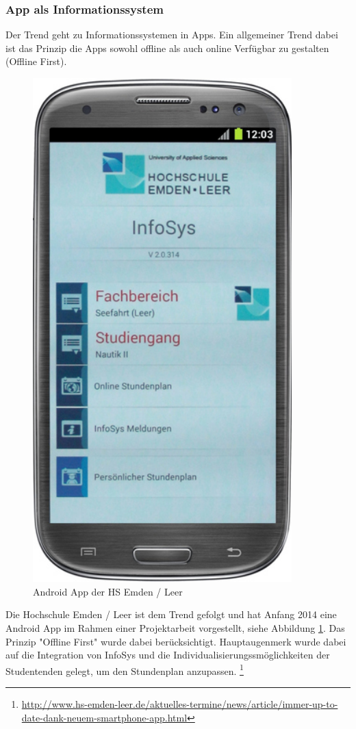 \documentclass[a4paper, 12pt]{scrreprt}
\begin{document}
\subsubsection{App als Informationssystem}
Der Trend geht zu Informationssystemen in Apps. Ein allgemeiner Trend dabei ist das Prinzip die Apps sowohl offline als auch online Verfügbar zu gestalten (Offline First).

\begin{figure}[h!]
	\centering
	\includegraphics[width=10cm]{bilder_aurel/hsel-androidapp}
	\caption{Android App der HS Emden / Leer}
	\label{fig_hselandroidapp}
\end{figure}

Die Hochschule Emden / Leer ist dem Trend gefolgt und hat Anfang 2014 eine Android App im Rahmen einer Projektarbeit vorgestellt, siehe Abbildung \ref{fig_hselandroidapp}. Das Prinzip "Offline First" wurde dabei berücksichtigt. Hauptaugenmerk wurde dabei auf die Integration von InfoSys und die Individualisierungssmöglichkeiten der Studentenden gelegt, um den Stundenplan anzupassen. \footnote{\url{http://www.hs-emden-leer.de/aktuelles-termine/news/article/immer-up-to-date-dank-neuem-smartphone-app.html}}
\end{document}
